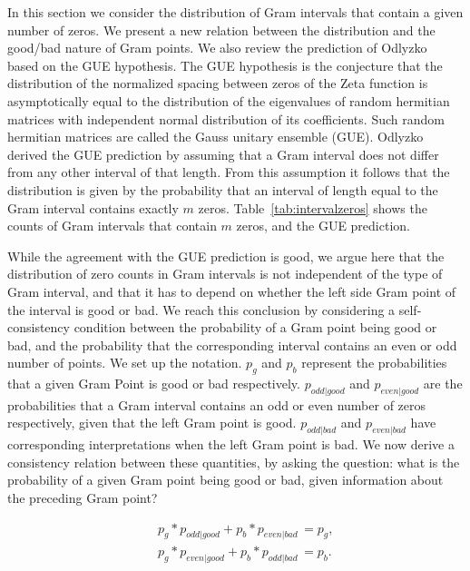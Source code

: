 \documentclass[twoside]{article}
\begin{document}
In this section we consider the distribution of Gram intervals that contain a given number of zeros. We present a new relation between the distribution and the good/bad nature of Gram points. We also review the prediction of Odlyzko~\cite{Odlyzko 1992} based on the GUE hypothesis. The GUE hypothesis  is the conjecture that the distribution of the normalized spacing between zeros of the Zeta function is asymptotically equal to the distribution of the eigenvalues of random hermitian matrices with independent normal distribution of its coefficients. Such random hermitian matrices are called the Gauss unitary ensemble (GUE).  Odlyzko derived the GUE prediction by assuming that a Gram interval does not differ from any other interval of that length. From this assumption it follows that the distribution is given by the probability that an interval of length equal to the Gram interval contains exactly $m$ zeros. Table~\ref{tab:intervalzeros} shows the counts of Gram intervals that contain $m$ zeros, and the GUE prediction.

While the agreement with the GUE prediction is good, we argue here that the distribution of zero counts in Gram intervals is not independent of the type of Gram interval, and that it has to depend on whether the left side Gram point of the interval is good or bad. We reach this conclusion by considering a self-consistency condition between the probability of a Gram point being good or bad, and the probability that the corresponding interval contains an even or odd number of points.  We set up the notation. $p_g$ and $p_b$ represent the probabilities that a given Gram Point is good or bad respectively.  $p_{odd|good}$ and $p_{even|good}$ are the probabilities that a Gram interval contains an odd or even number of zeros respectively, given that the left Gram point is good. $p_{odd|bad}$ and $p_{even|bad}$ have corresponding interpretations when the left Gram point is bad. We now derive a consistency relation between these quantities, by asking the question: what is the probability of a given Gram point being good or bad, given information about the preceding Gram point? 

\begin{eqnarray}
&&p_g*p_{odd|good}  + p_b*p_{even|bad}\, =  p_g,\nonumber\\
&&p_g*p_{even|good} + p_b*p_{odd|bad}\, = p_b.
\label{eqGoodRelation}
\end{eqnarray}
\end{document}
